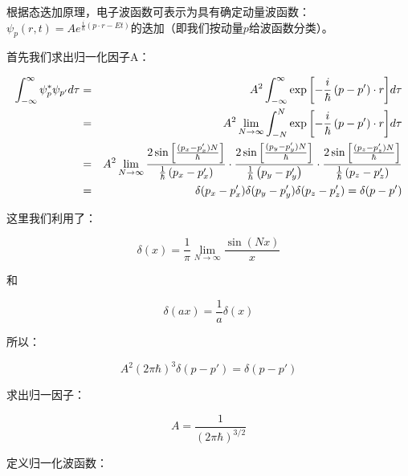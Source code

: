 根据态迭加原理，电子波函数可表示为具有确定动量波函数：$\psi _p (r,t) = Ae^{\frac{i}{\hbar }(p \cdot r - Et)} $的迭加（即我们按动量$p$给波函数分类）。

首先我们求出归一化因子A：

\begin{eqnarray*}
\int_{ - \infty }^\infty  \psi _p ^* \psi _{p'} d\tau &=& A^2 \int_{ - \infty }^\infty  {\exp \left[ { - \frac{i}{\hbar }\left( {p - p'} \right) \cdot r} \right]}  d\tau  \\
{} &=& A^2 \mathop {\lim }\limits_{N \to \infty } \int_{ - N}^N {\exp \left[ { - \frac{i}{\hbar }\left( {p - p'} \right) \cdot r} \right]} d\tau \\
{} &=& A^2 \mathop {\lim }\limits_{N \to \infty } \frac{{2\sin \left[ {{\textstyle{{(p_x  - p'_x )N} \over \hbar }}} \right]}}{{{\textstyle{1 \over \hbar }}\left( {p_x  - p'_x } \right)}} \cdot \frac{{2\sin \left[ {{\textstyle{{(p_y  - p'_y )N} \over \hbar }}} \right]}}{{{\textstyle{1 \over \hbar }}\left( {p_y  - p'_y } \right)}} \cdot \frac{{2\sin \left[ {{\textstyle{{(p_z  - p'_z )N} \over \hbar }}} \right]}}{{{\textstyle{1 \over \hbar }}\left( {p_z  - p'_z } \right)}} \\
{} &=&  \delta(p_x  - p'_x) \delta(p_y  - p'_y) \delta(p_z  - p'_z) = \delta (p - p')
\end{eqnarray*}

这里我们利用了：

\begin{equation}
\delta (x) = \frac{1}{\pi }\mathop {\lim }\limits_{N \to \infty } \frac{{\sin (Nx)}}{x}
\end{equation}

和

\begin{equation}
\delta (ax) = \frac{1}{a}\delta (x)
\end{equation}

所以：

\begin{equation*}
A^2 (2\pi \hbar )^3 \delta (p - p') = \delta (p - p')
\end{equation*}

求出归一因子：

\begin{equation}
A = \frac{1}{{\left( {2\pi \hbar } \right)^{3/2} }}
\end{equation}

定义归一化波函数：


